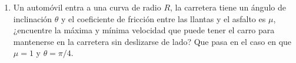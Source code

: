 \documentclass[letterpaper,10pt,onecolumn]{article}
\begin{document}
\begin{enumerate}
\item
Un automóvil entra a una curva de radio $R$, la carretera tiene un ángulo de inclinación $\theta$ y el coeficiente de fricción entre las llantas y el asfalto es $\mu$, ¿encuentre la máxima y mínima velocidad que puede tener el carro para mantenerse en la carretera sin deslizarse de lado?
Que pasa en el caso en que $\mu=1$ y $\theta=\pi/4$. 

\end{enumerate}
\end{document}
